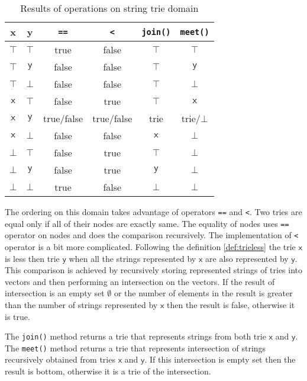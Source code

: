 \documentclass[12pt,final,oneside]{fithesis2}
\theoremstyle{definition}
\begin{document}
\begin{table}[ht]
\centering
\begin{tabular}{c|c|c|c|c|c}
 x & y & \texttt{==} & \texttt{<} & \texttt{join()} & \texttt{meet()} \\
\hline
$\top$       & $\top$       & true       & false      & $\top$       & $\top$ \\
$\top$       & $\mathsf{y}$ & false      & false      & $\top$       & $\mathsf{y}$ \\
$\top$       & $\bot$       & false      & false      & $\top$       & $\bot$ \\
$\mathsf{x}$ & $\top$       & false      & true       & $\top$       & $\mathsf{x}$ \\
$\mathsf{x}$ & $\mathsf{y}$ & true/false & true/false & trie         & trie/$\bot$ \\
$\mathsf{x}$ & $\bot$       & false      & false      & $\mathsf{x}$ & $\bot$ \\
$\bot$       & $\top$       & false      & true       & $\top$       & $\bot$ \\
$\bot$       & $\mathsf{y}$ & false      & true       & $\mathsf{y}$ & $\bot$ \\
$\bot$       & $\bot$       & true       & false      & $\bot$       & $\bot$
\end{tabular}
\caption{Results of operations on string trie domain}
\label{tab:trieops}
\end{table}

The ordering on this domain takes advantage of operators \texttt{==} and
\texttt{<}. Two tries are equal only if all of their nodes are exactly same.
The equality of nodes uses \texttt{==} operator on nodes and does the comparison
recursively. The implementation of \texttt{<} operator is a bit more
complicated. Following the definition \ref{def:trieless} the trie $\mathsf{x}$
is less then trie $\mathsf{y}$ when all the strings represented by $\mathsf{x}$
are also represented by $\mathsf{y}$. This comparison is achieved by recursively
storing represented strings of tries into vectors and then performing an
intersection on the vectors. If the result of intersection is an empty set
$\emptyset$ or the number of elements in the result is greater than the number
of strings represented by $\mathsf{x}$ then the result is false, otherwise
it is true.

The \texttt{join()} method returns a trie that represents strings from
both trie $\mathsf{x}$ and $\mathsf{y}$. The \texttt{meet()} method returns a trie that
represents intersection of strings recursively obtained from tries $\mathsf{x}$
and $\mathsf{y}$. If this intersection is empty set then the result is bottom,
otherwise it is a trie of the intersection.
\end{document}
